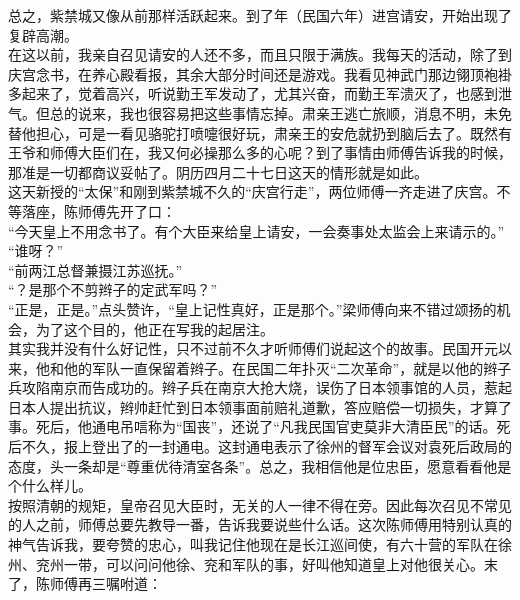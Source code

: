 总之，紫禁城又像从前那样活跃起来。到了年（民国六年）进宫请安，开始出现了复辟高潮。\\

在这以前，我亲自召见请安的人还不多，而且只限于满族。我每天的活动，除了到庆宫念书，在养心殿看报，其余大部分时间还是游戏。我看见神武门那边翎顶袍褂多起来了，觉着高兴，听说勤王军发动了，尤其兴奋，而勤王军溃灭了，也感到泄气。但总的说来，我也很容易把这些事情忘掉。肃亲王逃亡旅顺，消息不明，未免替他担心，可是一看见骆驼打喷嚏很好玩，肃亲王的安危就扔到脑后去了。既然有王爷和师傅大臣们在，我又何必操那么多的心呢？到了事情由师傅告诉我的时候，那准是一切都商议妥帖了。阴历四月二十七日这天的情形就是如此。\\

这天新授的“太保”和刚到紫禁城不久的“庆宫行走”，两位师傅一齐走进了庆宫。不等落座，陈师傅先开了口：\\

“今天皇上不用念书了。有个大臣来给皇上请安，一会奏事处太监会上来请示的。”\\

“谁呀？”\\

“前两江总督兼摄江苏巡抚。”\\

“？是那个不剪辫子的定武军吗？”\\

“正是，正是。”点头赞许，“皇上记性真好，正是那个。”梁师傅向来不错过颂扬的机会，为了这个目的，他正在写我的起居注。\\

其实我并没有什么好记性，只不过前不久才听师傅们说起这个的故事。民国开元以来，他和他的军队一直保留着辫子。在民国二年扑灭“二次革命”，就是以他的辫子兵攻陷南京而告成功的。辫子兵在南京大抢大烧，误伤了日本领事馆的人员，惹起日本人提出抗议，辫帅赶忙到日本领事面前赔礼道歉，答应赔偿一切损失，才算了事。死后，他通电吊唁称为“国丧”，还说了“凡我民国官吏莫非大清臣民”的话。死后不久，报上登出了的一封通电。这封通电表示了徐州的督军会议对袁死后政局的态度，头一条却是“尊重优待清室各条”。总之，我相信他是位忠臣，愿意看看他是个什么样儿。\\

按照清朝的规矩，皇帝召见大臣时，无关的人一律不得在旁。因此每次召见不常见的人之前，师傅总要先教导一番，告诉我要说些什么话。这次陈师傅用特别认真的神气告诉我，要夸赞的忠心，叫我记住他现在是长江巡间使，有六十营的军队在徐州、兖州一带，可以问问他徐、兖和军队的事，好叫他知道皇上对他很关心。末了，陈师傅再三嘱咐道：\\

